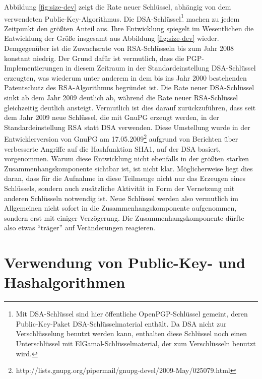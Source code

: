 Abbildung \ref{fig:size-dev} zeigt die Rate neuer Schlüssel,
abhängig von dem verwendeten Public-Key-Algorithmus. Die
DSA-Schlüssel\footnote{Mit DSA-Schlüssel sind hier öffentliche
  OpenPGP-Schlüssel gemeint, deren Public-Key-Paket
  DSA-Schlüsselmaterial enthält. Da DSA nicht zur
  Verschlüsselung benutzt werden kann, enthalten diese Schlüssel
  noch einen Unterschlüssel mit ElGamal-Schlüsselmaterial, der zum
  Verschlüsseln benutzt wird.} machen zu jedem Zeitpunkt den
größten Anteil aus. Ihre Entwicklung spiegelt im Wesentlichen die
Entwicklung der Größe insgesamt aus Abbildung \ref{fig:size-dev}
wieder. Demgegenüber ist die Zuwachsrate von RSA-Schlüsseln bis
zum Jahr 2008 konstant niedrig. Der Grund dafür ist vermutlich, dass
die PGP-Implementierungen in diesem Zeitraum in der
Standardeinstellung DSA-Schlüssel erzeugten, was wiederum unter
anderem in dem bis ins Jahr 2000 bestehenden Patentschutz des
RSA-Algorithmus begründet ist.  Die Rate neuer DSA-Schlüssel sinkt
ab dem Jahr 2009 deutlich ab, während die Rate neuer RSA-Schlüssel
gleichzeitig deutlich ansteigt. Vermutlich ist dies darauf
zurückzuführen, dass seit dem Jahr 2009 neue Schlüssel, die mit
GnuPG erzeugt werden, in der Standardeinstellung RSA statt DSA
verwenden. Diese Umstellung wurde in der Entwicklerversion von GnuPG
am
17.05.2009\footnote{http://lists.gnupg.org/pipermail/gnupg-devel/2009-May/025079.html}
aufgrund von Berichten über verbesserte Angriffe auf die
Hashfunktion SHA1\cite{McDonald2009}, auf der DSA basiert,
vorgenommen. Warum diese Entwicklung nicht ebenfalls in der größten
starken Zusammenhangskomponente sichtbar ist, ist nicht
klar. Möglicherweise liegt dies daran, dass für die Aufnahme in
diese Teilmenge nicht nur das Erzeugen eines Schlüssels, sondern
auch zusätzliche Aktivität in Form der Vernetzung mit anderen
Schlüsseln notwendig ist. Neue Schlüssel werden also vermutlich im
Allgemeinen nicht sofort in die Zusammenhangskomponente aufgenommen,
sondern erst mit einiger Verzögerung. Die Zusammenhangskomponente
dürfte also etwas ``träger'' auf Veränderungen reagieren.

\section{Verwendung von Public-Key- und Hashalgorithmen}
\label{sec:public-key-und}

